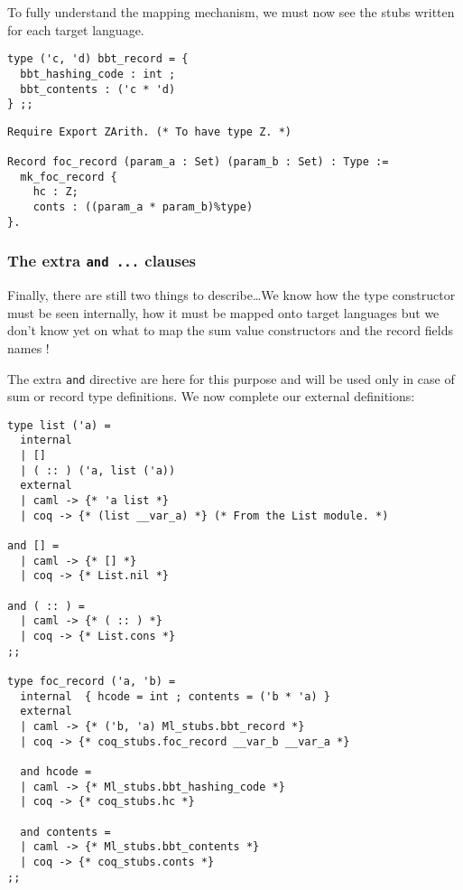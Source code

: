 To fully understand the mapping mechanism, we must now see the stubs
written for each target language.

{\footnotesize
\begin{lstlisting}[frameround=fttt, frame=trBL, language=MyOCaml,
                   title=Stub file ml\_stubs.ml]
type ('c, 'd) bbt_record = {
  bbt_hashing_code : int ;
  bbt_contents : ('c * 'd)
} ;;
\end{lstlisting}
}

{\footnotesize
\begin{lstlisting}[frameround=fttt, frame=trBL,
                   language=MyCoq, title=Stub file coq\_stubs.v]
Require Export ZArith. (* To have type Z. *)

Record foc_record (param_a : Set) (param_b : Set) : Type :=
  mk_foc_record {
    hc : Z;
    conts : ((param_a * param_b)%type)
}.
\end{lstlisting}
}


\subsubsection{The extra {\tt and ...} clauses}
\label{external-ty-def-extra-clauses}
Finally, there are still two things to describe\ldots We know how the
type constructor must be seen internally, how it must be mapped onto
target languages but we don't know yet on what to map the sum value
constructors and the record fields names !

The extra {\tt and} directive are here for this purpose and will be
used only in case of sum or record type definitions. We now complete
our external definitions:

{\footnotesize
\begin{lstlisting}[title=External type definitions (3)]
type list ('a) =
  internal
  | []
  | ( :: ) ('a, list ('a))
  external
  | caml -> {* 'a list *}
  | coq -> {* (list __var_a) *} (* From the List module. *)

and [] =
  | caml -> {* [] *}
  | coq -> {* List.nil *}

and ( :: ) =
  | caml -> {* ( :: ) *}
  | coq -> {* List.cons *}
;;

type foc_record ('a, 'b) =
  internal  { hcode = int ; contents = ('b * 'a) }
  external
  | caml -> {* ('b, 'a) Ml_stubs.bbt_record *}
  | coq -> {* coq_stubs.foc_record __var_b __var_a *}

  and hcode =
  | caml -> {* Ml_stubs.bbt_hashing_code *}
  | coq -> {* coq_stubs.hc *}

  and contents =
  | caml -> {* Ml_stubs.bbt_contents *}
  | coq -> {* coq_stubs.conts *}
;;
\end{lstlisting}
}

